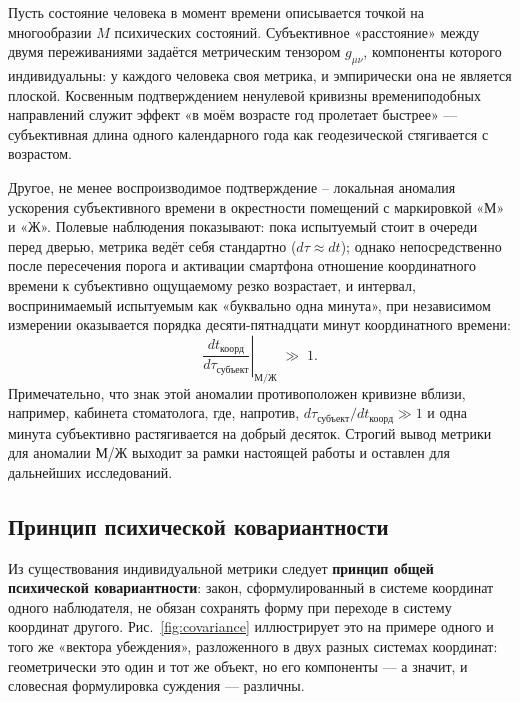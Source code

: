 \documentclass[11pt,a4paper]{article}
\begin{document}
Пусть состояние человека в момент времени описывается точкой на многообразии $M$ психических состояний. Субъективное «расстояние» между двумя переживаниями задаётся метрическим тензором $g_{\mu\nu}$, компоненты которого индивидуальны: у каждого человека своя метрика, и эмпирически она не является плоской. Косвенным подтверждением ненулевой кривизны времениподобных направлений служит эффект «в моём возрасте год пролетает быстрее» — субъективная длина одного календарного года как геодезической стягивается с возрастом.

Другое, не менее воспроизводимое подтверждение -- локальная аномалия ускорения субъективного времени в окрестности помещений с маркировкой «М» и «Ж». Полевые наблюдения показывают: пока испытуемый стоит в очереди перед дверью, метрика ведёт себя стандартно ($d\tau\approx dt$); однако непосредственно после пересечения порога и активации смартфона отношение координатного времени к субъективно ощущаемому резко возрастает, и интервал, воспринимаемый испытуемым как «буквально одна минута», при независимом измерении оказывается порядка десяти-пятнадцати минут координатного времени:
\[
\left.\frac{dt_{\text{коорд}}}{d\tau_{\text{субъект}}}\right|_{\text{М/Ж}} \;\gg\; 1.
\]
Примечательно, что знак этой аномалии противоположен кривизне вблизи, например, кабинета стоматолога, где, напротив, $d\tau_{\text{субъект}}/dt_{\text{коорд}}\gg1$ и одна минута субъективно растягивается на добрый десяток. Строгий вывод метрики для аномалии М/Ж выходит за рамки настоящей работы и оставлен для дальнейших исследований.

\subsection{Принцип психической ковариантности}

Из существования индивидуальной метрики следует \textbf{принцип общей психической ковариантности}: закон, сформулированный в системе координат одного наблюдателя, не обязан сохранять форму при переходе в систему координат другого. Рис.~\ref{fig:covariance} иллюстрирует это на примере одного и того же «вектора убеждения», разложенного в двух разных системах координат: геометрически это один и тот же объект, но его компоненты — а значит, и словесная формулировка суждения — различны.
\end{document}
